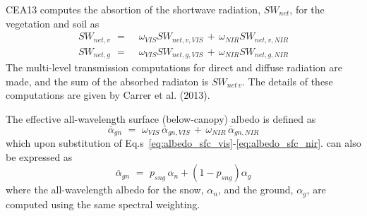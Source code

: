 %
CEA13 computes the absortion of the shortwave radiation, $SW_{net}$,
for the vegetation and soil as
%
\begin{align}
SW_{net,v} \,\ =&\,\, \omega_{VIS}SW_{net,v,VIS} \,+\,  \omega_{NIR} SW_{net,v,NIR}
\\
SW_{net,g} \,\ =&\,\, \omega_{VIS}SW_{net,g,VIS} \,+\,  \omega_{NIR} SW_{net,g,NIR}
\end{align}
%
The multi-level transmission computations 
for direct and diffuse radiation are made, and the sum of the absorbed
radiaton is $SW_{net\,v}$.
The details of these computations are given by
Carrer et al. (2013)\nocite{carrer_ea_2013}.


The effective all-wavelength surface (below-canopy) albedo 
is defined as
%
\begin{equation}
  \label{eq:meb_albedo_ng_specw}
{\overline\alpha}_{gn} \,\, = \,\, 
\omega_{VIS}\,{\overline\alpha}_{gn,VIS}\,+\,  
\omega_{NIR}\,{\overline\alpha}_{gn,NIR}
%
\end{equation}
%
which upon substitution
of Eq.s~\ref{eq:albedo_sfc_vis}-\ref{eq:albedo_sfc_nir}.
can also be expressed as
%
\begin{equation}
  \label{eq:meb_albedo_ng}
{\overline\alpha}_{gn} \,\, = \,\, 
p_{sng}\,\alpha_n + \left( 1 - p_{sng}\right){\alpha}_g
%
\end{equation}
%
where the all-wavelength albedo for the snow, $\alpha_{n}$, 
and the ground, $\alpha_{g}$, 
are computed using the same spectral weighting.
%
